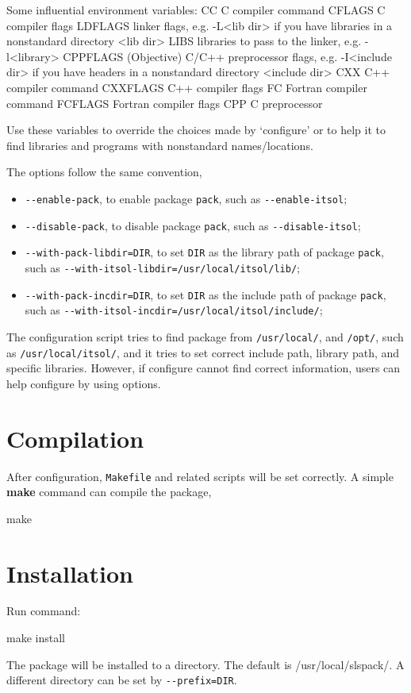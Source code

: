 \begin{evb}
Some influential environment variables:
  CC          C compiler command
  CFLAGS      C compiler flags
  LDFLAGS     linker flags, e.g. -L<lib dir> if you have libraries in a
              nonstandard directory <lib dir>
  LIBS        libraries to pass to the linker, e.g. -l<library>
  CPPFLAGS    (Objective) C/C++ preprocessor flags, e.g. -I<include dir> if
              you have headers in a nonstandard directory <include dir>
  CXX         C++ compiler command
  CXXFLAGS    C++ compiler flags
  FC          Fortran compiler command
  FCFLAGS     Fortran compiler flags
  CPP         C preprocessor

Use these variables to override the choices made by `configure' or to help
it to find libraries and programs with nonstandard names/locations.
\end{evb}

The options follow the same convention,
\begin{itemize}
\item \verb|--enable-pack|, to enable package \verb|pack|, such as \verb|--enable-itsol|;
\item \verb|--disable-pack|, to disable package \verb|pack|, such as \verb|--disable-itsol|;
\item \verb|--with-pack-libdir=DIR|, to set \verb|DIR| as the library path of package \verb|pack|, 
    such as \verb|--with-itsol-libdir=/usr/local/itsol/lib/|;
\item \verb|--with-pack-incdir=DIR|, to set \verb|DIR| as the include path of package \verb|pack|, 
    such as \verb|--with-itsol-incdir=/usr/local/itsol/include/|;
\end{itemize}

The configuration script tries to find package from \verb|/usr/local/|, and \verb|/opt/|,
such as \verb|/usr/local/itsol/|, and it tries to set correct include path, library path, and 
specific libraries. However, if configure cannot find correct information, 
users can help configure by using options.

\section{Compilation}
After configuration, \verb|Makefile| and related scripts will be set correctly.
A simple {\color{blue}\textbf{make}} command can compile the package,

\begin{evb}
make
\end{evb}

\section{Installation}
Run command:
\begin{evb}
make install
\end{evb}
The package will be installed to a directory. The default is /usr/local/slspack/. 
A different directory can be set by \verb|--prefix=DIR|.

